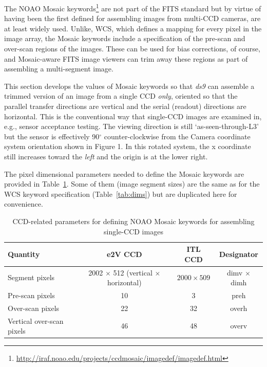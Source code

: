 \documentclass{article}[12pt]
\begin{document}
The NOAO Mosaic keywords\footnote{\url{http://iraf.noao.edu/projects/ccdmosaic/imagedef/imagedef.html}} are not part of the FITS standard but by virtue of having been the first defined for assembling images from multi-CCD cameras, are at least widely used.  Unlike, WCS, which defines a mapping for every pixel in the image array, the Mosaic keywords include a specification of the pre-scan and over-scan regions of the images.  These can be used for bias corrections, of course, and Mosaic-aware FITS image viewers can trim away these regions as part of assembling a multi-segment image.

This section develops the values of Mosaic keywords so that {\it ds9} can assemble a trimmed version of an image from a single CCD {\it only}, oriented so that the parallel transfer directions are vertical and the serial (readout) directions are horizontal.  This is the conventional way that single-CCD images are examined in, e.g., sensor acceptance testing.  The viewing direction is still `as-seen-through-L3' but the sensor is effectively 90$^\circ$ counter-clockwise from the Camera coordinate system orientation shown in Figure 1.  In this rotated system, the x coordinate still increases toward the {\it left} and the origin is at the lower right.

The pixel dimensional parameters needed to define the Mosaic keywords are provided in Table~\ref{tab:mosaic}.  Some of them (image segment sizes) are the same as for the WCS keyword specification (Table~\ref{tab:dims}) but are duplicated here for convenience.

\begin{table}
\begin{centering}
\begin{tabular}{| l | c | c | c |}
\hline
{\bf Quantity} & {\bf e2V CCD} & {\bf ITL CCD} & {\bf Designator} \\
\hline
Segment pixels & 2002 $\times$ 512 (vertical $\times$ horizontal) & $2000 \times 509$ & dimv $\times$ dimh \\
Pre-scan pixels & 10 & 3 & preh \\
Over-scan pixels & 22 & 32 & overh \\
Vertical over-scan pixels & 46 & 48 & overv \\
\hline
\end{tabular}
\caption{CCD-related parameters for defining NOAO Mosaic keywords for assembling single-CCD images\label{tab:mosaic}}
\end{centering}
\end{table}
\end{document}
